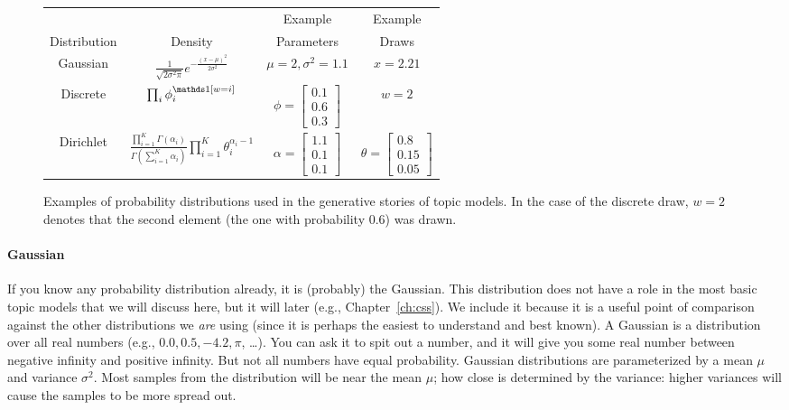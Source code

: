 \begin{figure}
\small
{}
  \begin{tabular}{cccc}
\hline
\rowcolor{gray!50}
 & & Example & Example \\
\rowcolor{gray!50}
    Distribution & Density & Parameters & Draws \\
    \hline \hline
    Gaussian  & $\frac{1}{\sqrt{2 \sigma^2 \pi}} e^{- \frac{(x-\mu)^2}{2 \sigma^2}}$ & $\mu=2, \sigma^2=1.1$ & $x=2.21$\\
    Discrete  & $\prod_i \phi_i^{\ind{w=i}}$ & $\phi=\begin{bmatrix}
           0.1 \\
           0.6 \\
           0.3
         \end{bmatrix}$
                                                & $w=2$ \\
   Dirichlet & $\frac{\prod_{i=1}^K \Gamma(\alpha_i)}{\Gamma \left( \sum_{i=1}^K \alpha_i \right)} \prod_{i=1}^K \theta_i^{\alpha_i - 1} $ & $\alpha = \begin{bmatrix}
           1.1 \\
           0.1 \\
           0.1
         \end{bmatrix}$  & $\theta = \begin{bmatrix}
           0.8 \\
           0.15 \\
           0.05
         \end{bmatrix}$ \\
     \hline
  \end{tabular}
  \caption{Examples of probability distributions used in the
    generative stories of topic models.  In the case of the discrete
    draw, $w=2$ denotes that the second element (the one with
    probability $0.6$) was drawn.}
  \label{fig:distribution_examples}
\end{figure}

\paragraph{Gaussian} If you know any probability distribution already,
it is (probably) the
Gaussian.  This distribution does not have a role in the most basic topic models that we will
discuss here, but it will later (e.g., Chapter~\ref{ch:css}).  We
include it because it is a useful point of comparison against the other
distributions we {\em are} using (since it is perhaps the easiest to understand and best
known). A Gaussian is a distribution over all real numbers (e.g., $0.0, 0.5,
-4.2, \pi$, \dots).  You can ask it to spit out a number, and it will give you
some real number between negative infinity and positive infinity.  But not all
numbers have equal probability.  Gaussian distributions are parameterized by a
mean $\mu$ and variance $\sigma^2$.  Most samples from the distribution will be
near the mean $\mu$; how close is determined by the variance: higher variances
will cause the samples to be more spread out.


